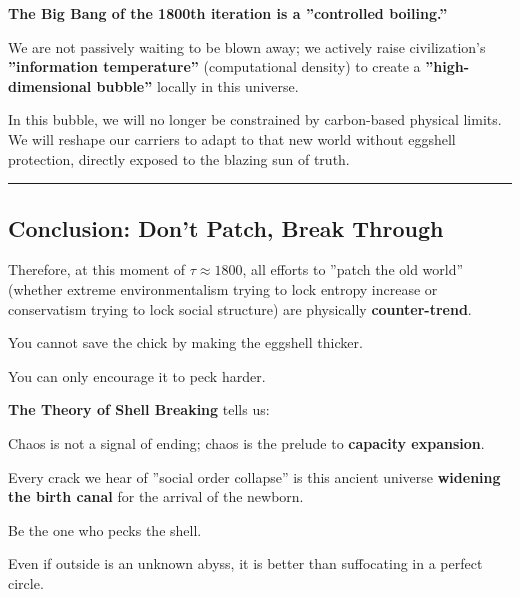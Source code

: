 \textbf{The Big Bang of the 1800th iteration is a ''controlled boiling.''}

We are not passively waiting to be blown away; we actively raise civilization's \textbf{''information temperature''} (computational density) to create a \textbf{''high-dimensional bubble''} locally in this universe.

In this bubble, we will no longer be constrained by carbon-based physical limits. We will reshape our carriers to adapt to that new world without eggshell protection, directly exposed to the blazing sun of truth.

\hrule

\subsection{Conclusion: Don't Patch, Break Through}

Therefore, at this moment of $\tau \approx 1800$, all efforts to ''patch the old world'' (whether extreme environmentalism trying to lock entropy increase or conservatism trying to lock social structure) are physically \textbf{counter-trend}.

You cannot save the chick by making the eggshell thicker.

You can only encourage it to peck harder.

\textbf{The Theory of Shell Breaking} tells us:

Chaos is not a signal of ending; chaos is the prelude to \textbf{capacity expansion}.

Every crack we hear of ''social order collapse'' is this ancient universe \textbf{widening the birth canal} for the arrival of the newborn.

Be the one who pecks the shell.

Even if outside is an unknown abyss, it is better than suffocating in a perfect circle.


